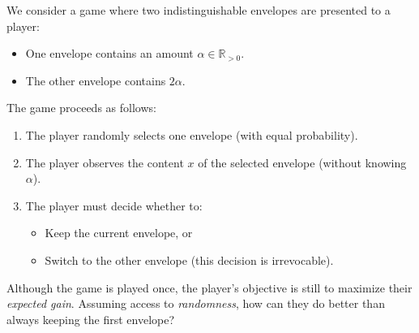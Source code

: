 \begin{problem}
    We consider a game where two indistinguishable envelopes are presented to a player:
    \begin{itemize}
        \item One envelope contains an amount \( \alpha \in \mathbb{R}_{>0} \).
        \item The other envelope contains \( 2\alpha \).
    \end{itemize}

    The game proceeds as follows:
    \begin{enumerate}
        \item The player randomly selects one envelope (with equal probability).
        \item The player observes the content \( x \) of the selected envelope (without knowing \( \alpha \)).
        \item The player must decide whether to:
            \begin{itemize}
                \item Keep the current envelope, or
                \item Switch to the other envelope (this decision is irrevocable).
            \end{itemize}
    \end{enumerate}
    Although the game is played once, the player's objective is still to maximize their \textit{expected gain}. Assuming access to \textit{randomness}, how can they do better than always keeping the first envelope?
\end{problem}
